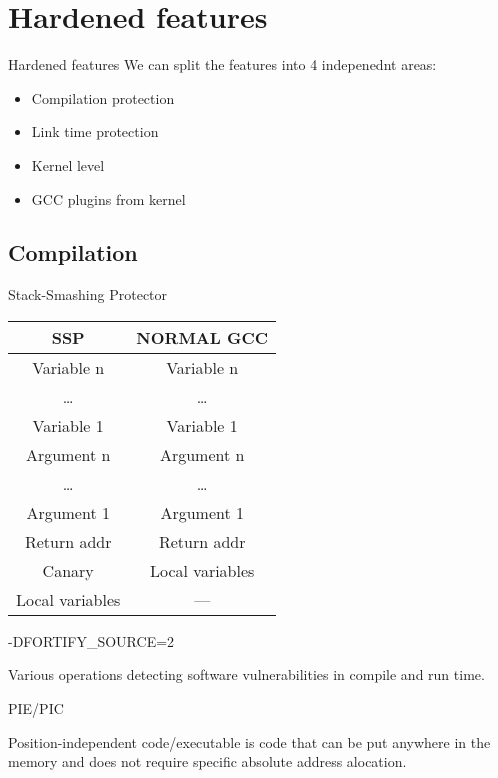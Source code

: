 \documentclass{beamer}
\begin{document}
\section{Hardened features}

\begin{frame}{Hardened features}
	We can split the features into 4 indepenednt areas:
	\begin{itemize}
		\item Compilation protection
		\item Link time protection
		\item Kernel level
		\item GCC plugins from kernel
	\end{itemize}
\end{frame}

\subsection{Compilation}

\begin{frame}{Stack-Smashing Protector}
	\begin{center}
	\begin{tabular}{|c|c|}
		\hline
		SSP & NORMAL GCC \\
		\hline
		Variable n & Variable n \\
		\ldots & \ldots \\
		Variable 1 & Variable 1 \\
		Argument n & Argument n \\
		\ldots & \ldots \\
		Argument 1 & Argument 1 \\
		Return addr & Return addr \\
		Canary & Local variables \\
		Local variables & --- \\
		\hline
	\end{tabular}
	\end{center}
\end{frame}

\begin{frame}{-DFORTIFY\_SOURCE=2}
	\begin{center}
		Various operations detecting software vulnerabilities in compile and run time.
	\end{center}
\end{frame}

\begin{frame}{PIE/PIC}
	\begin{center}
	Position-independent code/executable is code that can be put anywhere in the memory and does not require specific absolute address alocation.
	\end{center}
\end{frame}
\end{document}
